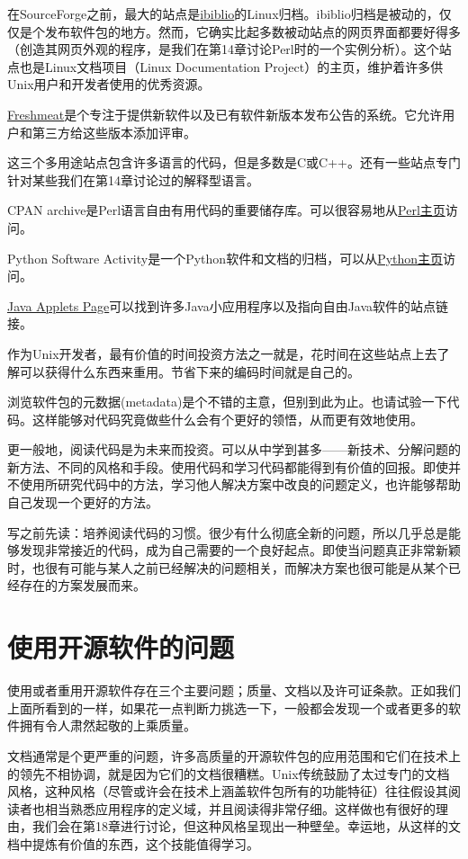 \documentclass[12pt,oneside]{book}
\begin{document}
\begin{common-format}
在SourceForge之前，最大的站点是\href{http://www.ibiblio.org/}{ibiblio}的Linux归档。ibiblio归档是被动的，仅仅是个发布软件包的地方。然而，它确实比起多数被动站点的网页界面都要好得多（创造其网页外观的程序，是我们在第14章讨论Perl时的一个实例分析）。这个站点也是Linux文档项目（Linux Documentation Project）的主页，维护着许多供Unix用户和开发者使用的优秀资源。

\href{http://www.freshmeat.net/}{Freshmeat}是个专注于提供新软件以及已有软件新版本发布公告的系统。它允许用户和第三方给这些版本添加评审。

这三个多用途站点包含许多语言的代码，但是多数是C或C++。还有一些站点专门针对某些我们在第14章讨论过的解释型语言。

CPAN archive是Perl语言自由有用代码的重要储存库。可以很容易地从\href{http://www.perl.com/perl}{Perl主页}访问。

Python Software Activity是一个Python软件和文档的归档，可以从\href{http://www.python.org/}{Python主页}访问。

\href{http://java.sun.com/applets/}{Java  Applets  Page}可以找到许多Java小应用程序以及指向自由Java软件的站点链接。

作为Unix开发者，最有价值的时间投资方法之一就是，花时间在这些站点上去了解可以获得什么东西来重用。节省下来的编码时间就是自己的。

浏览软件包的元数据(metadata)是个不错的主意，但别到此为止。也请试验一下代码。这样能够对代码究竟做些什么会有个更好的领悟，从而更有效地使用。

更一般地，阅读代码是为未来而投资。可以从中学到甚多——新技术、分解问题的新方法、不同的风格和手段。使用代码和学习代码都能得到有价值的回报。即使并不使用所研究代码中的方法，学习他人解决方案中改良的问题定义，也许能够帮助自己发现一个更好的方法。

写之前先读：培养阅读代码的习惯。很少有什么彻底全新的问题，所以几乎总是能够发现非常接近的代码，成为自己需要的一个良好起点。即使当问题真正非常新颖时，也很有可能与某人之前已经解决的问题相关，而解决方案也很可能是从某个已经存在的方案发展而来。

\section{使用开源软件的问题}
使用或者重用开源软件存在三个主要问题；质量、文档以及许可证条款。正如我们上面所看到的一样，如果花一点判断力挑选一下，一般都会发现一个或者更多的软件拥有令人肃然起敬的上乘质量。

文档通常是个更严重的问题，许多高质量的开源软件包的应用范围和它们在技术上的领先不相协调，就是因为它们的文档很糟糕。Unix传统鼓励了太过专门的文档风格，这种风格（尽管或许会在技术上涵盖软件包所有的功能特征）往往假设其阅读者也相当熟悉应用程序的定义域，并且阅读得非常仔细。这样做也有很好的理由，我们会在第18章进行讨论，但这种风格呈现出一种壁垒。幸运地，从这样的文档中提炼有价值的东西，这个技能值得学习。


\end{common-format}
\end{document}
